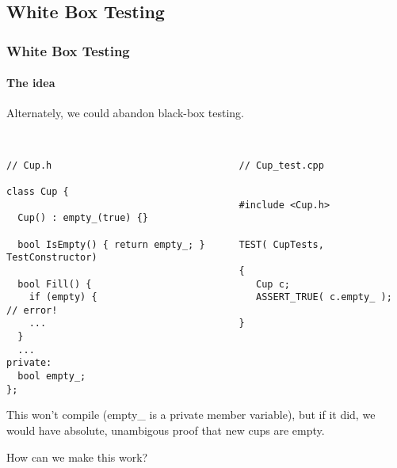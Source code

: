 \subsection{White Box Testing}
\begin{frame}[fragile,t]
\frametitle{White Box Testing}
\framesubtitle {The idea}
Alternately, we could abandon black-box testing.
{\scriptsize\
\begin{verbatim}
// Cup.h                                 // Cup_test.cpp
                                         
class Cup {                              
                                         #include <Cup.h>                    
  Cup() : empty_(true) {}                                                    
                                                                             
  bool IsEmpty() { return empty_; }      TEST( CupTests, TestConstructor)         
                                         {                                        
  bool Fill() {                             Cup c;                                
    if (empty) {                            ASSERT_TRUE( c.empty_ ); // error!
    ...                                  }                           
  }
  ...                                       
private:
  bool empty_;
};
\end{verbatim}}
This won't compile (empty\_ is a private member variable), but if it
did, we would have absolute, unambigous proof that new cups are empty.

How can we make this work?

\end{frame}

